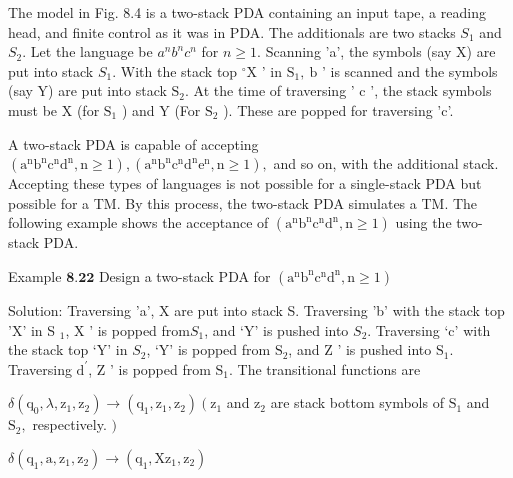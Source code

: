 \documentclass[8pt]{report}
\begin{document}
The model in Fig. 8.4 is a two-stack PDA containing an input tape, a reading head, and finite control as it was in PDA. The additionals are two stacks $S_{1}$ and $S_{2}$. Let the language be $a^{n} b^{n} c^{n}$ for $n \geq 1$. Scanning 'a', the symbols (say X) are put into stack $S_{1}$. With the stack top $^{\circ} \mathrm{X}$ ' in $\mathrm{S}_{1}, \mathrm{~b}$ ' is scanned and the symbols (say Y) are put into stack $\mathrm{S}_{2}$. At the time of traversing ' $\mathrm{c}$ ', the stack symbols must be $\mathrm{X}$ (for $\mathrm{S}_{1}$ ) and $\mathrm{Y}$ (For $\mathrm{S}_{2}$ ). These are popped for traversing 'c'.

 A two-stack PDA is capable of accepting $\left(\mathrm{a}^{\mathrm{n}} \mathrm{b}^{\mathrm{n}} \mathrm{c}^{\mathrm{n}} \mathrm{d}^{\mathrm{n}}, \mathrm{n} \geq 1\right),\left(\mathrm{a}^{\mathrm{n}} \mathrm{b}^{\mathrm{n}} \mathrm{c}^{\mathrm{n}} \mathrm{d}^{\mathrm{n}} \mathrm{e}^{\mathrm{n}}, \mathrm{n} \geq 1\right),$ and so on, with the
additional stack. Accepting these types of languages is not possible for a single-stack PDA but possible for a TM. By this process, the two-stack PDA simulates a TM. The following example shows the acceptance of $\left(\mathrm{a}^{\mathrm{n}} \mathrm{b}^{\mathrm{n}} \mathrm{c}^{\mathrm{n}} \mathrm{d}^{\mathrm{n}}, \mathrm{n} \geq 1\right)$ using the two-stack PDA.
	
Example
$\mathbf{8 . 2 2}$ Design a two-stack PDA for $\left(\mathrm{a}^{\mathrm{n}} \mathrm{b}^{\mathrm{n}} \mathrm{c}^{\mathrm{n}} \mathrm{d}^{\mathrm{n}}, \mathrm{n} \geq 1\right)$
	
Solution: Traversing 'a', X are put into stack S. Traversing 'b' with the stack top 'X' in S $_{1}$, $\mathrm{X}$ ' is popped from$ S_1$, and ‘Y’ is pushed into $S_2$. Traversing ‘c’ with the stack top ‘Y’ in $S_2$, ‘Y’ is popped from $\mathrm{S}_{2}$, and $\mathrm{Z}$ ' is pushed into $\mathrm{S}_{1}$. Traversing $\mathrm{d}^{\prime}$, $\mathrm{Z}$ ' is popped from $\mathrm{S}_{1}$. The transitional functions are




$\delta\left(\mathrm{q}_{0}, \lambda, \mathrm{z}_{1}, \mathrm{z}_{2}\right) \rightarrow\left(\mathrm{q}_{1}, \mathrm{z}_{1}, \mathrm{z}_{2}\right)\left(\mathrm{z}_{1}\right.$ and $\mathrm{z}_{2}$ are stack bottom symbols of $\mathrm{S}_{1}$ and $\mathrm{S}_{2},$ respectively.
 $)$
 
 
$\delta\left(\mathrm{q}_{1}, \mathrm{a}, \mathrm{z}_{1}, \mathrm{z}_{2}\right)\rightarrow\left(\mathrm{q}_{1}, \mathrm{Xz}_{1}, \mathrm{z}_{2}\right)$
\end{document}
